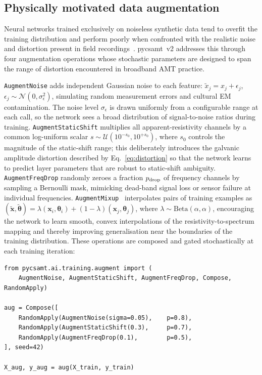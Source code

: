 \documentclass[review,12pt]{elsarticle}
\begin{document}
\subsection{Physically motivated data augmentation}
\label{sec:augment}

Neural networks trained exclusively on noiseless synthetic data tend to
overfit the training distribution and perform poorly when confronted with
the realistic noise and distortion present in field
recordings~\citep{Puzyrev2019}.
pycsamt~v2 addresses this through four augmentation operations whose
stochastic parameters are designed to span the range of distortion
encountered in broadband AMT practice.

\texttt{AugmentNoise} adds independent Gaussian noise to each feature:
$\tilde{x}_j = x_j + \epsilon_j$, $\epsilon_j\sim\mathcal{N}(0,\sigma_\epsilon^2)$,
simulating random measurement errors and cultural EM contamination.
The noise level $\sigma_\epsilon$ is drawn uniformly from a configurable
range at each call, so the network sees a broad distribution of
signal-to-noise ratios during training.
\texttt{AugmentStaticShift} multiplies all apparent-resistivity channels by
a common log-uniform scalar $s \sim \mathcal{U}(10^{-s_0},10^{+s_0})$,
where $s_0$ controls the magnitude of the static-shift range; this
deliberately introduces the galvanic amplitude distortion described by
Eq.~\eqref{eq:distortion} so that the network learns to predict
layer parameters that are robust to static-shift ambiguity.
\texttt{AugmentFreqDrop} randomly zeroes a fraction $p_{\rm drop}$ of
frequency channels by sampling a Bernoulli mask, mimicking dead-band signal
loss or sensor failure at individual frequencies.
\texttt{AugmentMixup}~\citep{Zhang2018} interpolates pairs of training
examples as $(\tilde{\mathbf{x}}, \tilde{\boldsymbol\theta}) =
\lambda(\mathbf{x}_i,\boldsymbol\theta_i) + (1-\lambda)(\mathbf{x}_j,\boldsymbol\theta_j)$,
where $\lambda\sim\mathrm{Beta}(\alpha,\alpha)$, encouraging the network to
learn smooth, convex interpolations of the resistivity-to-spectrum mapping
and thereby improving generalisation near the boundaries of the training
distribution.
These operations are composed and gated stochastically at each training
iteration:

\begin{lstlisting}[style=pycode, caption={Chaining augmenters with \texttt{Compose} and \texttt{RandomApply}.}]
from pycsamt.ai.training.augment import (
    AugmentNoise, AugmentStaticShift, AugmentFreqDrop, Compose, RandomApply)

aug = Compose([
    RandomApply(AugmentNoise(sigma=0.05),    p=0.8),
    RandomApply(AugmentStaticShift(0.3),     p=0.7),
    RandomApply(AugmentFreqDrop(0.1),        p=0.5),
], seed=42)

X_aug, y_aug = aug(X_train, y_train)
\end{lstlisting}
\end{document}
